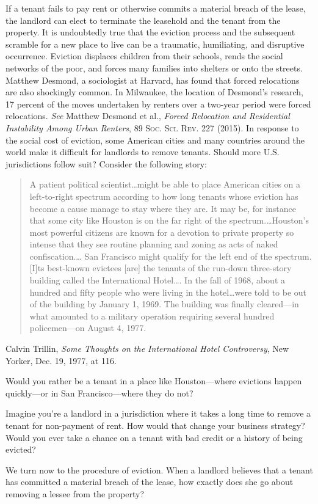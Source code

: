 If a tenant fails to pay rent or otherwise commits a material breach of the
lease, the landlord can elect to terminate the leasehold and
 the tenant
from the property.  It is undoubtedly true that the eviction process and the
subsequent scramble for a new place to live can be a traumatic, humiliating,
and disruptive occurrence.  Eviction displaces children from their schools,
rends the social networks of the poor, and forces many families into shelters
or onto the streets.  Matthew Desmond, a sociologist at Harvard, has found that
forced relocations are also shockingly common.  In Milwaukee, the location of
Desmond's research, 17 percent of the moves undertaken by renters over a
two-year period were forced relocations.  \textit{See} Matthew Desmond et al.,
\textit{Forced Relocation and Residential Instability Among Urban Renters}, 89
\textsc{Soc. Sci. Rev}. 227 (2015).  In response to the social cost of
eviction, some American cities and many countries around the world make it
difficult for landlords to remove tenants.  Should more U.S. jurisdictions
follow suit? Consider the following story:
\begin{quote}
A patient political scientist\dots might be able to place American cities on
a left-to-right spectrum according to how long tenants whose eviction has
become a cause manage to stay where they are.  It may be, for instance that
some city like Houston is on the far right of the spectrum.\ldots Houston's
most powerful citizens are known for a devotion to private property so intense
that they see routine planning and zoning as acts of naked confiscation.\ldots
San Francisco might qualify for the left end of the spectrum.  [I]ts best-known
evictees [are] the tenants of the run-down three-story building called the
International Hotel\ldots.  In the fall of 1968, about a hundred and fifty
people who were living in the hotel\ldots were told to be out of the building
by January 1, 1969.  The building was finally cleared---in what amounted to a
military operation requiring several hundred policemen---on August 4, 1977.  
\end{quote}
Calvin Trillin, \textit{Some Thoughts on the International Hotel Controversy},
New Yorker, Dec. 19, 1977, at 116.

\begin{questions}
\item Would you rather be a tenant in a place like Houston---where evictions
happen quickly---or in San Francisco---where they do not?  


\item Imagine you're a landlord in a jurisdiction where it takes a long time to
remove a tenant for non-payment of rent.  How would that change your business
strategy? Would you ever take a chance on a tenant with bad credit or a history
of being evicted? 
\end{questions}

We turn now to the procedure of eviction.  When a landlord believes that a
tenant has committed a material breach of the lease, how exactly does she go
about removing a lessee from the property? 
